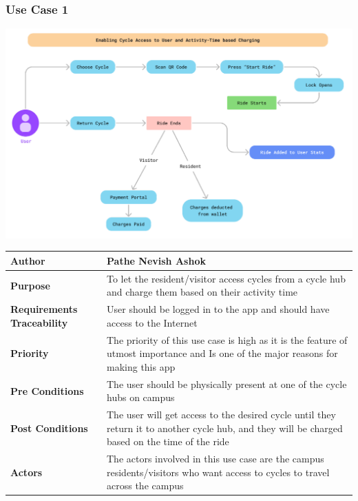 \documentclass[11pt]{article}
\begin{document}
\subsubsection{Use Case 1}
\begin{center}
\includegraphics*[scale=0.5]{usecase-1.png}
\begin{tabular}{|l|p{10cm}|}
    \hline
    \textbf{Author} & Pathe Nevish Ashok \\
    \hline
    \textbf{Purpose} & To let the resident/visitor access cycles from a cycle hub and charge them based on their activity time \\
    \hline
    \textbf{Requirements Traceability} &User should be logged in to the app and should have access to the Internet \\
    \hline
    \textbf{Priority} &The priority of this use case is high as it is the feature of utmost  importance and Is one of the major reasons for making this app \\
    \hline
    \textbf{Pre Conditions} &The user should be physically present at one of the cycle hubs on campus \\
    \hline
    \textbf{Post Conditions} & The user will get access to the desired cycle until they return it to another cycle hub, and they will be charged based on the time of the ride\\
    \hline
    \textbf{Actors} & The actors involved in this use case are the campus residents/visitors who want access to cycles to travel across the campus\\
    \hline
\end{tabular}
\end{center}
\end{document}
